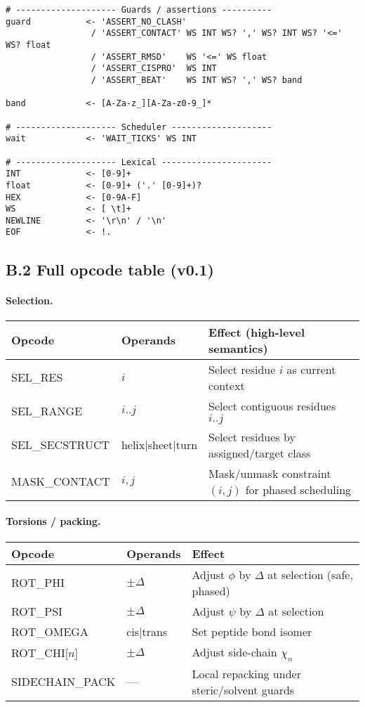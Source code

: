 \documentclass[12pt,a4paper]{article}
\begin{document}
\begin{verbatim}
# -------------------- Guards / assertions ----------
guard           <- 'ASSERT_NO_CLASH'
                 / 'ASSERT_CONTACT' WS INT WS? ',' WS? INT WS? '<=' WS? float
                 / 'ASSERT_RMSD'    WS '<=' WS float
                 / 'ASSERT_CISPRO'  WS INT
                 / 'ASSERT_BEAT'    WS INT WS? ',' WS? band

band            <- [A-Za-z_][A-Za-z0-9_]*

# -------------------- Scheduler --------------------
wait            <- 'WAIT_TICKS' WS INT

# -------------------- Lexical ----------------------
INT             <- [0-9]+
float           <- [0-9]+ ('.' [0-9]+)?
HEX             <- [0-9A-F]
WS              <- [ \t]+
NEWLINE         <- '\r\n' / '\n'
EOF             <- !.
\end{verbatim}

\subsection*{B.2 Full opcode table (v0.1)}
\paragraph{Selection.}
\begin{center}
\renewcommand{\arraystretch}{1.1}
\begin{tabular}{@{}lll@{}}
\toprule
Opcode & Operands & Effect (high-level semantics) \\
\midrule
SEL\_RES & $i$ & Select residue $i$ as current context \\
SEL\_RANGE & $i..j$ & Select contiguous residues $i..j$ \\
SEL\_SECSTRUCT & helix|sheet|turn & Select residues by assigned/target class \\
MASK\_CONTACT & $i,j$ & Mask/unmask constraint $(i,j)$ for phased scheduling \\
\bottomrule
\end{tabular}
\end{center}

\paragraph{Torsions / packing.}
\begin{center}
\renewcommand{\arraystretch}{1.1}
\begin{tabular}{@{}lll@{}}
\toprule
Opcode & Operands & Effect \\
\midrule
ROT\_PHI & $\pm\Delta$ & Adjust $\phi$ by $\Delta$ at selection (safe, phased) \\
ROT\_PSI & $\pm\Delta$ & Adjust $\psi$ by $\Delta$ at selection \\
ROT\_OMEGA & cis|trans & Set peptide bond isomer \\
ROT\_CHI[$n$] & $\pm\Delta$ & Adjust side-chain $\chi_n$ \\
SIDECHAIN\_PACK & — & Local repacking under steric/solvent guards \\
\bottomrule
\end{tabular}
\end{center}
\end{document}

